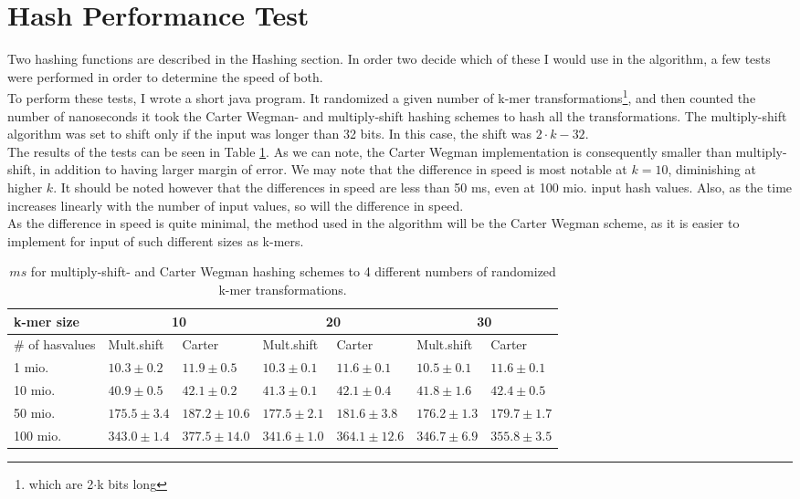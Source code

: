 \documentclass[../../main.tex]{subfiles}
\begin{document}
\section{Hash Performance Test}

Two hashing functions are described in the Hashing section. In order two decide which of these I would use in the algorithm, a few tests were performed in order to determine the speed of both.\\

To perform these tests, I wrote a short java program. It randomized a given number of k-mer transformations\footnote{which are 2$\cdot$k bits long}, and then counted the number of nanoseconds it took the Carter Wegman- and multiply-shift hashing schemes to hash all the transformations. The multiply-shift algorithm was set to shift only if the input was longer than 32 bits. In this case, the shift was $2\cdot k - 32$.\\

The results of the tests can be seen in Table \ref{table:hashTest}. As we can note, the Carter Wegman implementation is consequently smaller than multiply-shift, in addition to having larger margin of error. We may note that the difference in speed is most notable at $k=10$, diminishing at higher $k$. It should be noted however that the differences in speed are less than 50 ms, even at 100 mio. input hash values. Also, as the time increases linearly with the number of input values, so will the difference in speed.\\

As the difference in speed is quite minimal, the method used in the algorithm will be the Carter Wegman scheme, as it is easier to implement for input of such different sizes as k-mers.
\begin{table}[h]
\begin{tabular}{| l | l | l | l | l | l | l |}
\hline
k-mer size & \multicolumn{2}{c|}{10} & \multicolumn{2}{c|}{20} & \multicolumn{2}{c|}{30} \\
\hline
\# of hasvalues & Mult.shift & Carter & Mult.shift & Carter & Mult.shift & Carter \\
 \hline
1 mio. & $10.3\pm 0.2$ & $11.9\pm 0.5$ & $10.3\pm 0.1$ & $11.6\pm 0.1$ & $10.5\pm 0.1$ & $11.6\pm 0.1$\\
10 mio. & $40.9\pm 0.5$ & $42.1\pm0.2$ & $41.3\pm 0.1$ & $42.1\pm0.4$ & $41.8\pm 1.6$ & $42.4\pm0.5$\\
50 mio. & $175.5\pm3.4$ & $187.2\pm 10.6$ & $177.5\pm2.1$  & $181.6\pm3.8$ & $176.2\pm1.3$ & $179.7\pm1.7$\\
100 mio. & $343.0\pm1.4$ & $377.5\pm14.0$ & $341.6\pm1.0$ & $364.1\pm12.6$ & $346.7\pm6.9$ & $355.8\pm3.5$\\
\hline
\end{tabular}
\caption{$ms$ for multiply-shift- and Carter Wegman hashing schemes to 4 different numbers of randomized k-mer transformations.}
\label{table:hashTest}
\end{table}
\end{document}
